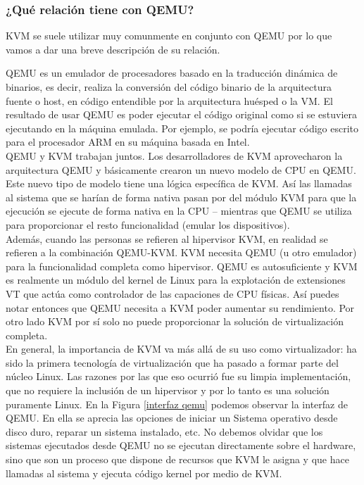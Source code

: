 \documentclass[11pt]{article}
\begin{document}
\subsubsection{¿Qué relación tiene con QEMU?}
KVM se suele utilizar muy comunmente en conjunto con QEMU por lo que vamos a dar una breve descripción de su relación.

QEMU es un emulador de procesadores basado en la traducción dinámica de binarios, es decir, realiza la conversión del código binario de la arquitectura fuente o host, en código entendible por la arquitectura huésped o la VM. El resultado de usar QEMU es poder ejecutar el código original como si se estuviera ejecutando en la máquina emulada. Por ejemplo, se podría ejecutar código escrito para el procesador ARM en su máquina basada en Intel. \\

QEMU y KVM trabajan juntos. Los desarrolladores de KVM aprovecharon la arquitectura QEMU y básicamente crearon un nuevo modelo de CPU en QEMU. Este nuevo tipo de modelo tiene una lógica específica de KVM. Así las llamadas al sistema que se harían de forma nativa pasan por del módulo KVM para que la ejecución se ejecute de forma nativa en la CPU -- mientras que QEMU se utiliza para proporcionar el resto funcionalidad (emular los dispositivos). \\

Además, cuando las personas se refieren al hipervisor KVM, en realidad se refieren a la combinación QEMU-KVM. KVM necesita QEMU (u otro emulador) para la funcionalidad completa como hipervisor. QEMU es autosuficiente y KVM es realmente un módulo del kernel de Linux para la explotación de extensiones VT que actúa como controlador de las capaciones de CPU físicas. Así puedes notar entonces que QEMU necesita a KVM poder aumentar su rendimiento. Por otro lado KVM por sí solo no puede proporcionar la solución de virtualización completa. \\

En general, la importancia de KVM va más allá de su uso como virtualizador: ha sido la primera tecnología de virtualización que ha pasado a formar parte del núcleo Linux. Las razones por las que eso ocurrió fue su limpia implementación, que no requiere la inclusión de un hipervisor y por lo tanto es una solución puramente Linux. En la Figura \ref{interfaz qemu} podemos observar la interfaz de QEMU. En ella se aprecia las opciones de iniciar un Sistema operativo desde disco duro, reparar un sistema instalado, etc. No debemos olvidar que los sistemas ejecutados desde QEMU no se ejecutan directamente sobre el hardware, sino que son un proceso que dispone de recursos que KVM le asigna y que hace llamadas al sistema y ejecuta código kernel por medio de KVM.
\end{document}
